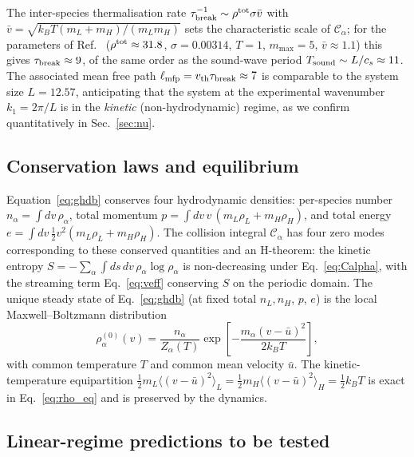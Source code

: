 \documentclass[aps,pre,twocolumn,superscriptaddress,longbibliography,floatfix]{revtex4-2}
\begin{document}
The inter-species thermalisation rate
$\tau_{\rm break}^{-1}\sim\rho^{\rm tot}\sigma\bar v$ with
$\bar v=\sqrt{k_BT(m_L+m_H)/(m_L m_H)}$ sets the characteristic
scale of $\mathcal{C}_\alpha$; for the parameters of
Ref.~\cite{PaperIII} ($\rho^{\rm tot}\approx 31.8$,
$\sigma=0.00314$, $T=1$, $m_{\max}=5$, $\bar v\approx 1.1$)
this gives $\tau_{\rm break}\approx 9$, of the same order as
the sound-wave period $T_{\rm sound}\sim L/c_s\approx 11$.
The associated mean free path
$\ell_{\rm mfp}=v_{\rm th}\tau_{\rm break}\approx 7$ is
comparable to the system size $L=12.57$, anticipating that
the system at the experimental wavenumber $k_1=2\pi/L$ is in
the \emph{kinetic} (non-hydrodynamic) regime, as we confirm
quantitatively in Sec.~\ref{sec:nu}.

\subsection{Conservation laws and equilibrium}

Equation~\eqref{eq:ghdb} conserves four hydrodynamic densities:
per-species number $n_\alpha=\int dv\,\rho_\alpha$, total
momentum $p=\int dv\,v\,(m_L\rho_L+m_H\rho_H)$, and total
energy $e=\int dv\,\tfrac12 v^2(m_L\rho_L+m_H\rho_H)$. The
collision integral $\mathcal{C}_\alpha$ has four zero modes
corresponding to these conserved quantities and an H-theorem:
the kinetic entropy
$S=-\sum_\alpha\int ds\,dv\,\rho_\alpha\log\rho_\alpha$ is
non-decreasing under Eq.~\eqref{eq:Calpha}, with the
streaming term Eq.~\eqref{eq:veff} conserving $S$ on the
periodic domain. The unique steady state of Eq.~\eqref{eq:ghdb}
(at fixed total $n_L, n_H$, $p$, $e$) is the local
Maxwell--Boltzmann distribution
\begin{equation}
\rho_\alpha^{(0)}(v) = \frac{n_\alpha}{Z_\alpha(T)}
  \exp\!\left[-\frac{m_\alpha (v-\bar u)^2}{2 k_B T}\right],
\label{eq:rho_eq}
\end{equation}
with common temperature $T$ and common mean velocity $\bar u$.
The kinetic-temperature equipartition
$\tfrac12 m_L\langle(v-\bar u)^2\rangle_L = \tfrac12 m_H
\langle(v-\bar u)^2\rangle_H = \tfrac12 k_BT$ is exact in
Eq.~\eqref{eq:rho_eq} and is preserved by the dynamics.

\subsection{Linear-regime predictions to be tested}
\end{document}
